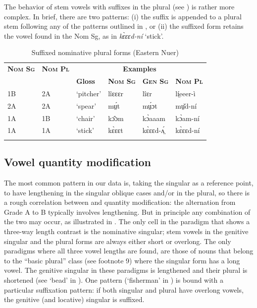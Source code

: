 \documentclass[output=paper,newtxmath,modfonts,nonflat]{langsci/langscibook}
\begin{document}
The behavior of stem vowels with suffixes in the  plural (see ) is rather more complex. In brief, there are two patterns: (i) the suffix is appended to a plural stem following any of the patterns outlined in , or (ii) the suffixed form retains the vowel found in the Nom Sg, as in \textit{kɛ̀ɛɛd-ní} ‘stick’.


\begin{table}
\begin{tabularx}{\textwidth}{ll XXXX}
\lsptoprule

\bfseries\scshape Nom Sg & \bfseries\scshape Nom Pl & \multicolumn{4}{c}{\bfseries Examples}\\
\cmidrule{3-6}
&  & \bfseries Gloss & \bfseries\scshape Nom Sg & \bfseries\scshape Gen Sg & \bfseries\scshape Nom Pl\\
\midrule
1B & 2A & ‘pitcher’ & lîɛɛɛr & lîɛr & lí̤eeer-ì\\
2A & 2A & ‘spear’ & mṳ́t & mṳ́ɔt & mṳ̌d-ní\\
1A & 1B & ‘chair’ & kɔ̂ɔm & kɔ̀aaam & kɔ̀am-ní\\
1A & 1A & ‘stick’ & kɛ̀ɛɛt & kɛ̀ɛɛd-ʌ̤́ & kɛ̀ɛɛd-ní\\
\lspbottomrule
\end{tabularx}
\caption{Suffixed nominative plural forms (Eastern Nuer)}
\label{tab:monich:19}
\end{table}

\subsection{Vowel quantity modification} %

The most common pattern in our data is, taking the  singular as a reference point, to have lengthening in the singular oblique cases and/or in the plural, so there is a rough correlation between  and quantity modification: the alternation from Grade A to B typically involves lengthening. But in principle any combination of the two may occur, as illustrated in . The only cell in the paradigm that shows a three-way length contrast is the nominative singular; stem vowels in the genitive singular and the  plural forms are always either short or overlong. The only paradigms where all three vowel lengths are found, are those of nouns that belong to the “basic plural” class (see footnote 9) where the  singular form has a long vowel. The genitive singular in these paradigms is lengthened and their  plural is shortened (see ‘bead’ in ). One pattern (‘fisherman’ in ) is bound with a particular suffixation pattern:  if both  singular and plural have overlong vowels, the genitive (and locative) singular is suffixed. 
\end{document}
